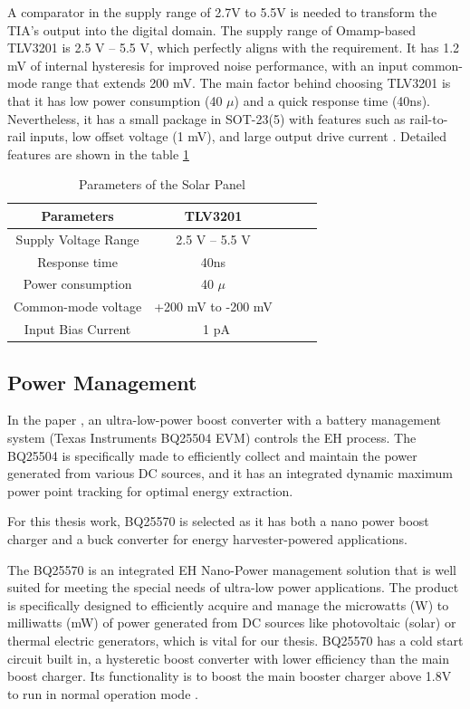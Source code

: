 A comparator in the supply range of 2.7V to 5.5V is needed to transform the \ac{TIA}'s output into the digital domain. The supply range of Omamp-based TLV3201 is 2.5 V – 5.5 V, which perfectly aligns with the requirement. It has 1.2 mV of internal hysteresis for improved noise performance, with an input common-mode range that extends 200 mV. The main factor behind choosing TLV3201 is that it has low power consumption (40 \( \mu \)) and a quick response time (40ns). Nevertheless, it has a small package in SOT-23(5) with features such as rail-to-rail inputs, low offset voltage (1 mV), and large output drive current \cite{sbos561}. Detailed 
features are shown in the table \ref{tab:4.5}

\begin{table}
    \centering
    \caption{Parameters of the Solar Panel}
    \begin{tabular}{|c|c|c|c|c|}
         \hline
         \textbf{Parameters} &\textbf{TLV3201}  \\
         \hline
         Supply Voltage Range  &2.5 V – 5.5 V  \\
         \hline
         Response time  &40ns  \\
         \hline
         Power consumption  &40 \( \mu \)  \\
         \hline
         Common-mode voltage &+200 mV to -200 mV \\
         \hline
         Input Bias Current &~1 pA  \\
         \hline
    \end{tabular}
    \label{tab:4.5}
\end{table}



\subsection{Power Management}

In the paper \cite{de2024reconfigurable}, an ultra-low-power boost converter with a battery management system (Texas Instruments BQ25504 EVM) controls the \ac{EH} process. The BQ25504 is specifically made to efficiently collect and maintain the power generated from various DC sources, and it has an integrated dynamic maximum power point tracking for optimal energy extraction.

For this thesis work, BQ25570 is selected as it has both a nano power boost charger and a buck converter for energy harvester-powered applications. 

The BQ25570 is an integrated \ac{EH} Nano-Power management solution that is well suited for meeting the special needs of ultra-low power applications. The product is specifically designed to efficiently acquire and manage the microwatts (\textmu W) to milliwatts (mW) of power generated from DC sources like photovoltaic (solar) or thermal electric generators\cite{slusbh2}, which is vital for our thesis. BQ25570 has a cold start circuit built in, a hysteretic boost converter with lower efficiency than the main boost charger. Its functionality is to boost the main booster charger above 1.8V to run in normal operation mode \cite{slusbh2}.

